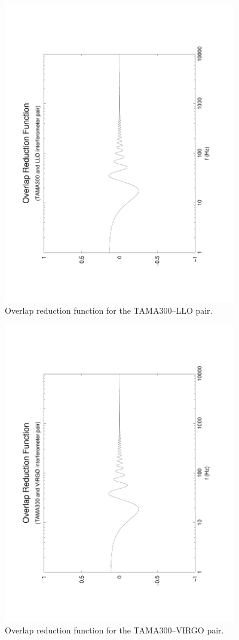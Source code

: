 \documentclass{article}
\begin{document}
%
%
\begin{figure}[htb!]
\begin{center}
\noindent\includegraphics[width=4in,angle=-90]{TAMA300LLO}
\caption{\label{f:TAMA300LLO}
Overlap reduction function for the TAMA300--LLO pair.}
\end{center}
\end{figure}
%
%
\begin{figure}[htb!]
\begin{center}
\noindent\includegraphics[width=4in,angle=-90]{TAMA300VIRGO}
\caption{\label{f:TAMA300VIRGO}
Overlap reduction function for the TAMA300--VIRGO pair.}
\end{center}
\end{figure}
\end{document}

